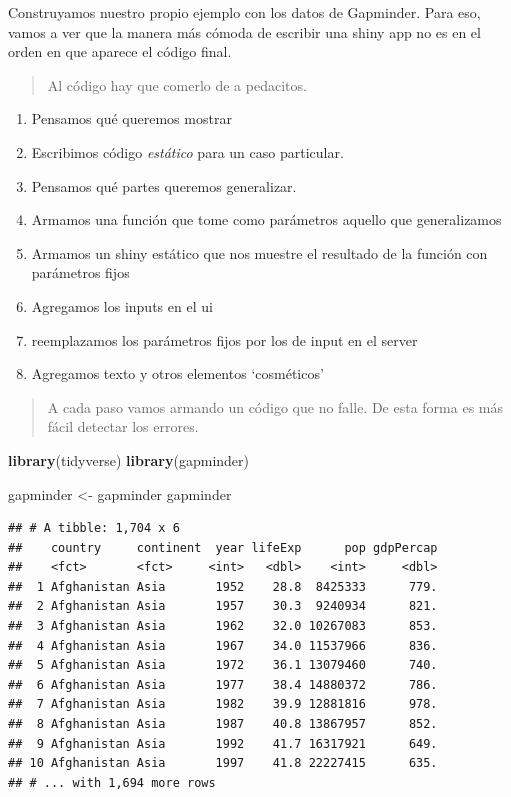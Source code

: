 \documentclass[]{book}
\newenvironment{Shaded}{\begin{snugshade}}{\end{snugshade}}
\newcommand{\KeywordTok}[1]{\textcolor[rgb]{0.13,0.29,0.53}{\textbf{#1}}}
\newcommand{\NormalTok}[1]{#1}
\newcommand{\StringTok}[1]{\textcolor[rgb]{0.31,0.60,0.02}{#1}}
\providecommand{\tightlist}{%
  \setlength{\itemsep}{0pt}\setlength{\parskip}{0pt}}
\begin{document}
Construyamos nuestro propio ejemplo con los datos de Gapminder. Para eso, vamos a ver que la manera más cómoda de escribir una shiny app no es en el orden en que aparece el código final.

\begin{quote}
Al código hay que comerlo de a pedacitos.
\end{quote}

\begin{enumerate}
\def\labelenumi{\arabic{enumi}.}
\tightlist
\item
  Pensamos qué queremos mostrar
\item
  Escribimos código \emph{estático} para un caso particular.
\item
  Pensamos qué partes queremos generalizar.
\item
  Armamos una función que tome como parámetros aquello que generalizamos
\item
  Armamos un shiny estático que nos muestre el resultado de la función con parámetros fijos
\item
  Agregamos los inputs en el ui
\item
  reemplazamos los parámetros fijos por los de input en el server
\item
  Agregamos texto y otros elementos `cosméticos'
\end{enumerate}

\begin{quote}
A cada paso vamos armando un código que no falle. De esta forma es más fácil detectar los errores.
\end{quote}

\begin{Shaded}
\begin{Highlighting}[]
\KeywordTok{library}\NormalTok{(tidyverse)}
\KeywordTok{library}\NormalTok{(gapminder)}

\NormalTok{gapminder <-}\StringTok{ }\NormalTok{gapminder}
\NormalTok{gapminder}
\end{Highlighting}
\end{Shaded}

\begin{verbatim}
## # A tibble: 1,704 x 6
##    country     continent  year lifeExp      pop gdpPercap
##    <fct>       <fct>     <int>   <dbl>    <int>     <dbl>
##  1 Afghanistan Asia       1952    28.8  8425333      779.
##  2 Afghanistan Asia       1957    30.3  9240934      821.
##  3 Afghanistan Asia       1962    32.0 10267083      853.
##  4 Afghanistan Asia       1967    34.0 11537966      836.
##  5 Afghanistan Asia       1972    36.1 13079460      740.
##  6 Afghanistan Asia       1977    38.4 14880372      786.
##  7 Afghanistan Asia       1982    39.9 12881816      978.
##  8 Afghanistan Asia       1987    40.8 13867957      852.
##  9 Afghanistan Asia       1992    41.7 16317921      649.
## 10 Afghanistan Asia       1997    41.8 22227415      635.
## # ... with 1,694 more rows
\end{verbatim}
\end{document}
